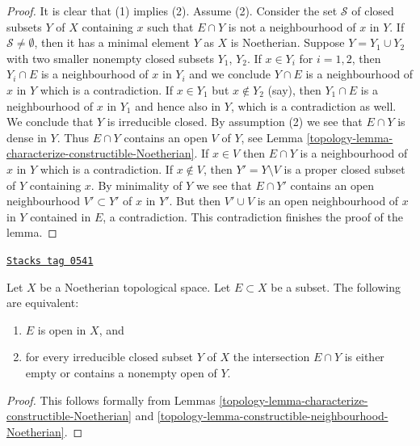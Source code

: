 \begin{proof}

It is clear that (1) implies (2). Assume (2).
Consider the set $\mathcal{S}$ of closed subsets $Y$ of $X$ containing $x$
such that $E \cap Y$ is not a neighbourhood of $x$ in $Y$.
If $\mathcal{S} \not = \emptyset$, then it has a minimal element $Y$
as $X$ is Noetherian. Suppose $Y = Y_1 \cup Y_2$ with two smaller nonempty
closed subsets $Y_1$, $Y_2$. If $x \in Y_i$ for $i = 1, 2$, then $Y_i \cap E$
is a neighbourhood of $x$ in $Y_i$ and we conclude $Y \cap E$ is a
neighbourhood of $x$ in $Y$ which is a contradiction. If $x \in Y_1$ but
$x \not\in Y_2$ (say), then $Y_1 \cap E$ is a neighbourhood of $x$ in
$Y_1$ and hence also in $Y$, which is a contradiction as well.
We conclude that $Y$ is irreducible closed. By assumption (2) we see that
$E \cap Y$ is dense in $Y$. Thus $E \cap Y$ contains an open $V$ of $Y$, see
Lemma \ref{topology-lemma-characterize-constructible-Noetherian}.
If $x \in V$ then $E \cap Y$ is a neighbourhood of $x$ in $Y$ which
is a contradiction. If $x \not \in V$, then $Y' = Y \setminus V$ is a
proper closed subset of $Y$ containing $x$. By minimality of $Y$
we see that $E \cap Y'$ contains an open neighbourhood $V' \subset Y'$
of $x$ in $Y'$. But then $V' \cup V$ is an open neighbourhood of $x$
in $Y$ contained in $E$, a contradiction.
This contradiction finishes the proof of the lemma.
\end{proof}

\begin{lemma}
\label{topology-lemma-characterize-open-Noetherian}
\href{https://stacks.math.columbia.edu/tag/0541}{\texttt{Stacks tag 0541}}

Let $X$ be a Noetherian topological space.
Let $E \subset X$ be a subset.
The following are equivalent:
\begin{enumerate}
\item $E$ is open in $X$, and
\item for every irreducible closed subset $Y$ of $X$
the intersection $E \cap Y$ is either empty or
contains a nonempty open of $Y$.
\end{enumerate}
\end{lemma}

\begin{proof}

This follows formally from
Lemmas \ref{topology-lemma-characterize-constructible-Noetherian} and
\ref{topology-lemma-constructible-neighbourhood-Noetherian}.
\end{proof}

